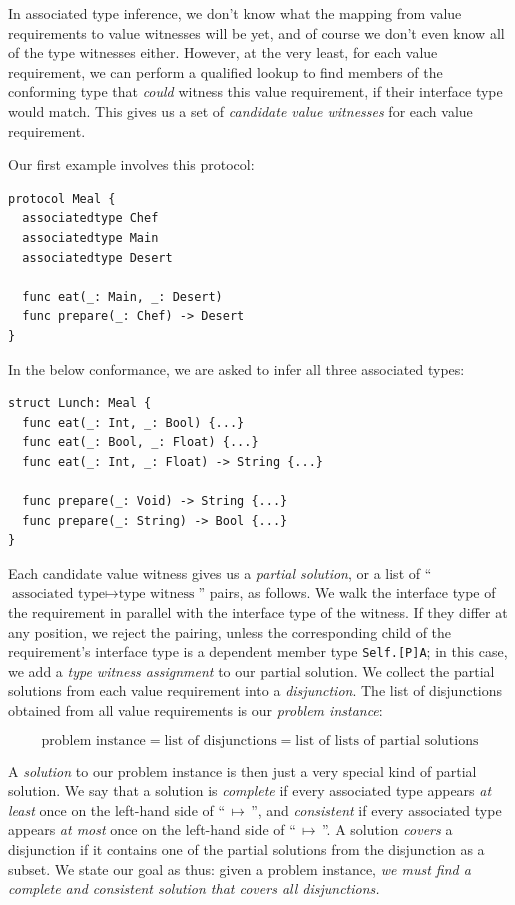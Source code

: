 \documentclass[../generics]{subfiles}
\begin{document}
In associated type inference, we don't know what the mapping from value requirements to value witnesses will be yet, and of course we don't even know all of the type witnesses either. However, at the very least, for each value requirement, we can perform a qualified lookup to find members of the conforming type that \emph{could} witness this value requirement, if their interface type would match. This gives us a set of \emph{candidate value witnesses} for each value requirement.

\begin{example}\label{assoc type inference example 1}
Our first example involves this protocol:
\begin{Verbatim}
protocol Meal {
  associatedtype Chef
  associatedtype Main
  associatedtype Desert

  func eat(_: Main, _: Desert)
  func prepare(_: Chef) -> Desert
}
\end{Verbatim}
In the below conformance, we are asked to infer all three associated types:
\begin{Verbatim}
struct Lunch: Meal {
  func eat(_: Int, _: Bool) {...}
  func eat(_: Bool, _: Float) {...}
  func eat(_: Int, _: Float) -> String {...}

  func prepare(_: Void) -> String {...}
  func prepare(_: String) -> Bool {...}
}
\end{Verbatim}
\end{example}

Each candidate value witness gives us a \emph{partial solution}, or a list of ``$\text{associated type} \mapsto \text{type witness}$'' pairs, as follows. We walk the interface type of the requirement in parallel with the interface type of the witness. If they differ at any position, we reject the pairing, unless the corresponding child of the requirement's interface type is a dependent member type \texttt{Self.[P]A}; in this case, we add a \emph{type witness assignment} to our partial solution. We collect the partial solutions from each value requirement into a \emph{disjunction}. The list of disjunctions obtained from all value requirements is our \emph{problem instance}:
\begin{ceqn}
\[
\text{problem instance} = \text{list of disjunctions} = \text{list of lists of partial solutions}
\]
\end{ceqn}

A \emph{solution} to our problem instance is then just a very special kind of partial solution. We say that a solution is \emph{complete} if every associated type appears \emph{at least} once on the left-hand side of ``$\,\mapsto\,$'', and \emph{consistent} if every associated type appears \emph{at most} once on the left-hand side of ``$\,\mapsto\,$''. A solution \emph{covers} a disjunction if it contains one of the partial solutions from the disjunction as a subset. We state our goal as thus: given a problem instance, \textsl{we must find a complete and consistent solution that covers all disjunctions.}
\end{document}
